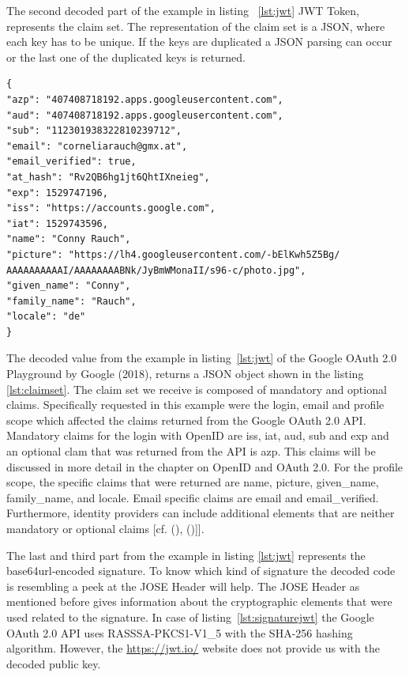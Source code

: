 The second decoded part of the example in listing ~\ref{lst:jwt} JWT Token, represents the claim set. The representation of the claim set is a JSON, where each key has to be unique. If the keys are duplicated a JSON parsing can occur or the last one of the duplicated keys is returned. 

\begin{lstlisting}
{
"azp": "407408718192.apps.googleusercontent.com",
"aud": "407408718192.apps.googleusercontent.com",
"sub": "112301938322810239712",
"email": "corneliarauch@gmx.at",
"email_verified": true,
"at_hash": "Rv2QB6hg1jt6QhtIXneieg",
"exp": 1529747196,
"iss": "https://accounts.google.com",
"iat": 1529743596,
"name": "Conny Rauch",
"picture": "https://lh4.googleusercontent.com/-bElKwh5Z5Bg/
AAAAAAAAAAI/AAAAAAAABNk/JyBmWMonaII/s96-c/photo.jpg",
"given_name": "Conny",
"family_name": "Rauch",
"locale": "de"
}
\end{lstlisting}

The decoded value from the example in listing~\ref{lst:jwt} of the Google OAuth 2.0 Playground  by Google (2018), returns a JSON object shown in the listing \ref{lst:claimset}. The claim set we receive is composed of mandatory and optional claims. Specifically requested in this example were the login, email and profile scope which affected the claims returned from the Google OAuth 2.0 API. Mandatory claims for the login with OpenID are iss, iat, aud, sub and exp and an optional clam that was returned from the API is azp. This claims will be discussed in more detail in the chapter on OpenID and OAuth 2.0. For the profile scope, the specific claims that were returned are name, picture, given\_name, family\_name, and locale. Email specific claims are email and email\_verified. Furthermore, identity providers can include additional elements that are neither mandatory or optional claims [cf. ({\cite{Google:2018:OAuthPlayground}), (\cite{Siriwardena:JWTJWSJWE:2016})]}].

The last and third part from the example in listing \ref{lst:jwt}  represents the base64url-encoded signature. To know which kind of signature the decoded code is resembling a peek at the JOSE Header will help. The JOSE Header as mentioned before gives information about the cryptographic elements that were used related to the signature. In case of listing~\ref{lst:signaturejwt} the Google OAuth 2.0 API uses RASSSA-PKCS1-V1\_5 with the SHA-256 hashing algorithm. However, the \href{https://jwt.io/} {https://jwt.io/} website does not provide us with the decoded public key. 

